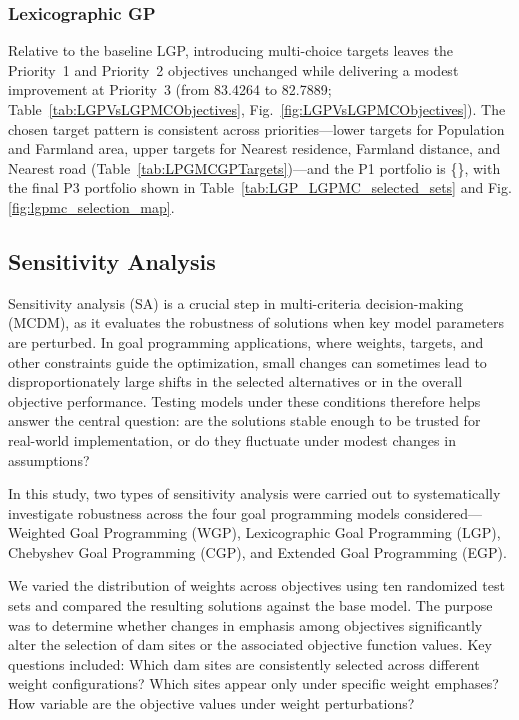 \subsubsection{Lexicographic GP}
Relative to the baseline LGP, introducing multi-choice targets leaves the Priority~1 and Priority~2 objectives unchanged while delivering a modest improvement at Priority~3 (from 83.4264 to 82.7889; Table~\ref{tab:LGPVsLGPMCObjectives}, Fig.~\ref{fig:LGPVsLGPMCObjectives}). The chosen target pattern is consistent across priorities—lower targets for Population and Farmland area, upper targets for Nearest residence, Farmland distance, and Nearest road (Table~\ref{tab:LPGMCGPTargets})—and the P1 portfolio is \{\LGPMCselPone\}, with the final P3 portfolio shown in Table~\ref{tab:LGP_LGPMC_selected_sets} and Fig. \ref{fig:lgpmc_selection_map}.









\subsection{Sensitivity Analysis}
Sensitivity analysis (SA) is a crucial step in multi-criteria decision-making (MCDM), as it evaluates the robustness of solutions when key model parameters are perturbed. In goal programming applications, where weights, targets, and other constraints guide the optimization, small changes can sometimes lead to disproportionately large shifts in the selected alternatives or in the overall objective performance. Testing models under these conditions therefore helps answer the central question: are the solutions stable enough to be trusted for real-world implementation, or do they fluctuate under modest changes in assumptions?

In this study, two types of sensitivity analysis were carried out to systematically investigate robustness across the four goal programming models considered—Weighted Goal Programming (WGP), Lexicographic Goal Programming (LGP), Chebyshev Goal Programming (CGP), and Extended Goal Programming (EGP).

We varied the distribution of weights across objectives using ten randomized test sets and compared the resulting solutions against the base model. The purpose was to determine whether changes in emphasis among objectives significantly alter the selection of dam sites or the associated objective function values. Key questions included: Which dam sites are consistently selected across different weight configurations? Which sites appear only under specific weight emphases? How variable are the objective values under weight perturbations?

